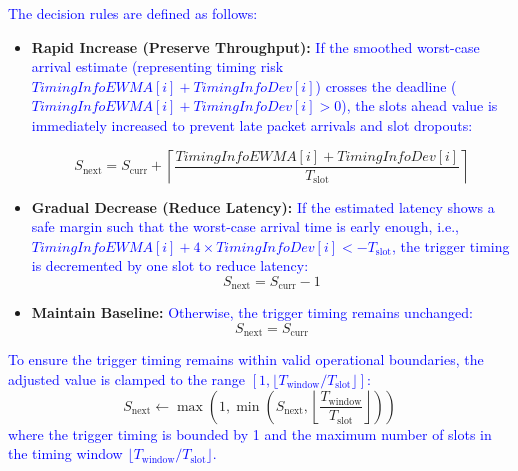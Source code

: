 \documentclass[10pt, conference, letterpaper]{IEEEtran}
\begin{document}
\textcolor{blue}{The decision rules are defined as follows:}
\begin{itemize}
    \item \textbf{Rapid Increase (Preserve Throughput):} \textcolor{blue}{If the smoothed worst-case arrival estimate (representing timing risk $\mathit{TimingInfoEWMA}[i] + \mathit{TimingInfoDev}[i]$) crosses the deadline ($\mathit{TimingInfoEWMA}[i] + \mathit{TimingInfoDev}[i] > 0$), the slots ahead value is immediately increased to prevent late packet arrivals and slot dropouts:}
          \begin{small}
          \begin{equation}
          S_{\mathrm{next}} = S_{\mathrm{curr}} + \left\lceil \frac{\mathit{TimingInfoEWMA}[i] + \mathit{TimingInfoDev}[i]}{T_{\mathrm{slot}}} \right\rceil
          \end{equation}
          \end{small}
    \item \textbf{Gradual Decrease (Reduce Latency):} \textcolor{blue}{If the estimated latency shows a safe margin such that the worst-case arrival time is early enough, i.e., $\mathit{TimingInfoEWMA}[i] + 4 \times \mathit{TimingInfoDev}[i] < -T_{\mathrm{slot}}$, the trigger timing is decremented by one slot to reduce latency:}
          \begin{equation}
          S_{\mathrm{next}} = S_{\mathrm{curr}} - 1
          \end{equation}
    \item \textbf{Maintain Baseline:} \textcolor{blue}{Otherwise, the trigger timing remains unchanged:}
          \begin{equation}
          S_{\mathrm{next}} = S_{\mathrm{curr}}
          \end{equation}
\end{itemize}
\textcolor{blue}{To ensure the trigger timing remains within valid operational boundaries, the adjusted value is clamped to the range $[1, \lfloor T_{\mathrm{window}} / T_{\mathrm{slot}} \rfloor]$:}
\begin{equation}
S_{\mathrm{next}} \gets \max\left(1, \min\left(S_{\mathrm{next}}, \left\lfloor \frac{T_{\mathrm{window}}}{T_{\mathrm{slot}}} \right\rfloor \right)\right)
\end{equation}
\textcolor{blue}{where the trigger timing is bounded by 1 and the maximum number of slots in the timing window $\lfloor T_{\mathrm{window}} / T_{\mathrm{slot}} \rfloor$.}
\end{document}

